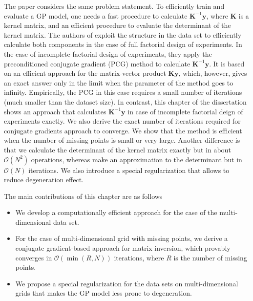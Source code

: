 The paper \citep{wilson2014fast} considers the same problem statement.
To efficiently train and evaluate a GP model, one needs a fast procedure
to calculate $\mathbf{K}^{-1}\mathbf{y}$,
where $\mathbf{K}$ is a kernel matrix,
and an efficient procedure to evaluate the determinant of the kernel matrix.
The authors of \citep{wilson2014fast} exploit the structure in the data set
to efficiently calculate both components in the case of full factorial design of experiments.
In the case of incomplete factorial design of experiments,
they apply the preconditioned conjugate gradient (PCG) method to calculate $\mathbf{K}^{-1}\mathbf{y}$.
It is based on an efficient approach for the matrix-vector product $\mathbf{K}\mathbf{y}$,
which, however, gives an exact answer only in the limit when the parameter of the method goes to infinity.
Empirically, the PCG in this case requires a small number of iterations (much smaller than the dataset size).
In contrast, this chapter of the dissertation shows an approach that calculates
$\mathbf{K}^{-1}\mathbf{y}$ in case of incomplete factorial deign of experiments exactly.
We also derive the exact number of iterations required for conjugate gradients approach to converge.
We show that the method is efficient when the number of missing points is small or very large.
Another difference is that we calculate the determinant of the kernel matrix exactly but in about
$\mathcal{O}(N^2)$ operations, whereas \citep{wilson2014fast} make an approximation to the determinant
but in $\mathcal{O}(N)$ iterations.
We also introduce a special regularization that allows to reduce degeneration effect.



The main contributions of this chapter are as follows
\begin{itemize}
  \item We develop a computationally efficient approach for the case of the multi-dimensional
  data set.
  \item For the case of multi-dimensional grid with missing points, we derive a conjugate gradient-based approach for matrix inversion, which provably converges in $\mathcal{O}(\min (R, N))$
  iterations, where $R$ is the number of missing points.
  \item We propose a special regularization for the data sets on multi-dimensional grids
  that makes the GP model less prone to degeneration.
\end{itemize}



